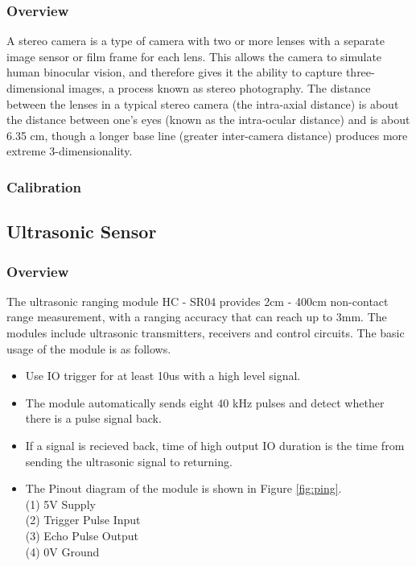 \subsubsection{Overview} 
A stereo camera is a type of camera with two or more lenses with a separate image sensor or film frame for each lens. This allows the camera to simulate human binocular vision, and therefore gives it the ability to capture three-dimensional images, a process known as stereo photography. The distance between the lenses in a typical stereo camera (the intra-axial distance) is about the distance between one's eyes (known as the intra-ocular distance) and is about 6.35 cm, though a longer base line (greater inter-camera distance) produces more extreme 3-dimensionality.

\subsubsection{Calibration}


\subsection{Ultrasonic Sensor}
\subsubsection{Overview}
The ultrasonic ranging module HC - SR04 provides 2cm - 400cm non-contact range measurement, with a ranging accuracy that can reach up to 3mm. The modules include ultrasonic transmitters, receivers and control circuits. The basic usage of the module is as follows.

\begin{itemize}
    \item  Use IO trigger for at least 10us with a high level signal.
    \item  The module automatically sends eight 40 kHz pulses and detect whether there is a pulse signal back.
    \item  If a signal is recieved back, time of high output IO duration is the time from sending the ultrasonic signal to returning.
    \item The Pinout diagram of the module is shown in Figure \ref{fig:ping}.\\
    (1) 5V Supply\\
    (2) Trigger Pulse Input\\
    (3) Echo Pulse Output\\
    (4) 0V Ground\\
\end{itemize} 

